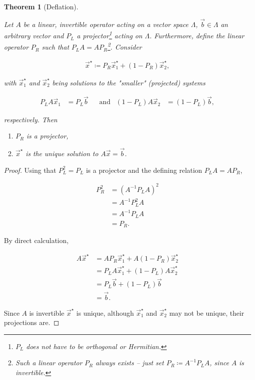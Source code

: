 \documentclass{article}
\theoremstyle{plain} %
\newtheorem{theorem}{Theorem}[section]
\theoremstyle{convention} %
\theoremstyle{remark} %
\numberwithin{equation}{section}
\begin{document}
\begin{theorem}[Deflation]

\label{thm:deflation}

Let $A$ be a linear, invertible operator acting on a vector space $\Lambda$, $\vec{b} \in \Lambda$ an arbitrary vector and $P_L$ a projector\footnote{$P_L$ does not have to be orthogonal or Hermitian.} acting on $\Lambda$. Furthermore, define the linear operator $P_R$ such that $P_L A = A P_R$\footnote{Such a linear operator $P_R$ always exists -- just set $P_R \coloneqq A^{-1} P_L A$, since $A$ is invertible.}. Consider 

\begin{align}
    \vec{x}^{\star} \coloneqq P_R \vec{x}^{\star}_1 + (1-P_R) \vec{x}^{\star}_2, \label{eq:def_projection}
\end{align}

with $\vec{x}^{\star}_1$ and $\vec{x}^{\star}_2$ being solutions to the "smaller" (projected) systems

\begin{align*}
    P_L A \vec{x}_1 &= P_L \vec{b}
    & &\text{and} &
    (1-P_L)A \vec{x}_2 &= (1-P_L)\vec{b},
\end{align*}

respectively. Then 

\begin{enumerate}[label={\arabic*)}]
  \item $P_R$ is a projector,
  \item $\vec{x}^{\star}$ is the unique solution to $A\vec{x} = \vec{b}$.
\end{enumerate}

\end{theorem}

\begin{proof}

Using that $P_L^2 = P_L$ is a projector and the defining relation $P_L A = A P_R$,

\begin{align*}
    P_R^2 &= (A^{-1} P_L A)^2 \\
    &= A^{-1} P_L^2 A \\
    &= A^{-1} P_L A \\
    &= P_R.
\end{align*}

By direct calculation,

\begin{align*}
    A \vec{x}^{\star} &= A P_R \vec{x}^{\star}_1 + A (1-P_R) \vec{x}^{\star}_2 \\
    &= P_L A \vec{x}^{\star}_1 + (1-P_L) A \vec{x}^{\star}_2 \\
    &= P_L \vec{b} + (1-P_L)\vec{b} \\
    &= \vec{b}.
\end{align*}

Since $A$ is invertible $\vec{x}^{\star}$ is unique, although $\vec{x}^{\star}_1$ and $\vec{x}^{\star}_2$ may not be unique, their projections are.

\end{proof}
\end{document}
